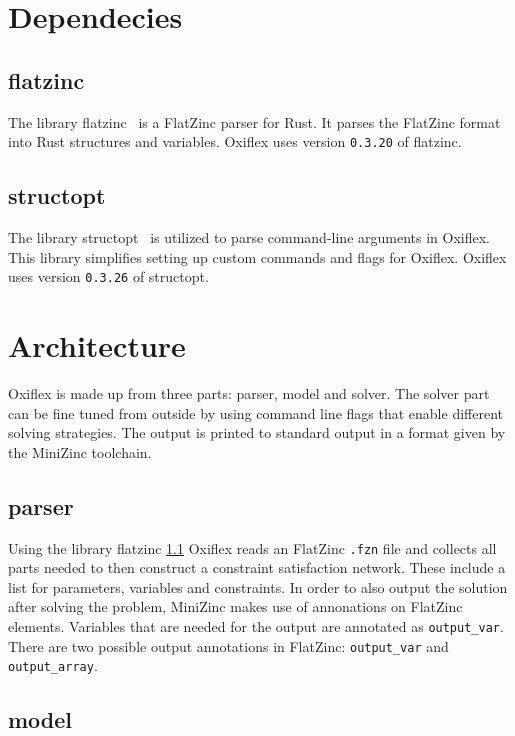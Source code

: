 \section{Dependecies}

\subsection{flatzinc} \label{flatzinc}

The library flatzinc~\cite{flatzinc:2020} is a FlatZinc parser for Rust. It parses the FlatZinc format into Rust structures and variables. Oxiflex uses version \verb|0.3.20| of flatzinc.

\subsection{structopt}

The library structopt~\cite{structopt:2020} is utilized to parse command-line arguments in Oxiflex. This library simplifies setting up custom commands and flags for Oxiflex. Oxiflex uses version \verb|0.3.26| of structopt.

\section{Architecture}

Oxiflex is made up from three parts: parser, model and solver. The solver part can be fine tuned from outside by using command line flags that enable different solving strategies. The output is printed to standard output in a format given by the MiniZinc toolchain.

\subsection{parser}

Using the library flatzinc \ref{flatzinc} Oxiflex reads an FlatZinc \verb|.fzn| file and collects all parts needed to then construct a constraint satisfaction network. These include a list for parameters, variables and constraints. In order to also output the solution after solving the problem, MiniZinc makes use of annonations on FlatZinc elements. Variables that are needed for the output are annotated as \verb|output_var|. There are two possible output annotations in FlatZinc: \verb|output_var| and \verb|output_array|.

\subsection{model} \label{model}

